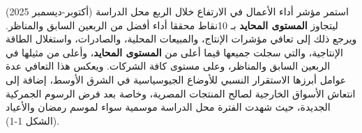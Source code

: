 استمر مؤشر أداء الأعمال في الارتفاع خلال الربع محل الدراسة (أكتوبر-ديسمبر 2025) ليتجاوز \textbf{المستوى المحايد} بـ 10نقاط محققا أداء أفضل من الربعين السابق والمناظر. ويرجع ذلك إلى تعافي مؤشرات الإنتاج، والمبيعات المحلية، والصادرات، واستغلال الطاقة الإنتاجية، والتي سجلت جميعها قيما أعلى من \textbf{المستوى المحايد}، وأعلى من مثيلها في الربعين السابق والمناظر، وعلى مستوى كافة الشركات. ويعكس هذا التعافي عدة عوامل أبرزها الاستقرار النسبي للأوضاع الجيوسياسية في الشرق الأوسط، إضافة إلى انتعاش الأسواق الخارجية لصالح المنتجات المصرية، وخاصة بعد فرض الرسوم الجمركية الجديدة، حيث شهدت الفترة محل الدراسة موسمية سواء لموسم رمضان والأعياد (الشكل 1-1).
